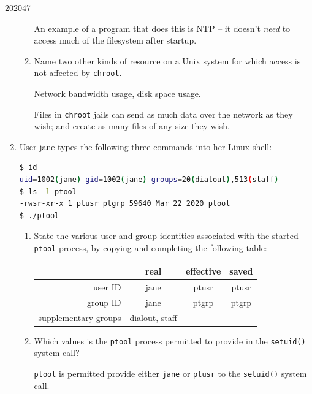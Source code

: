 \documentclass[10pt,\jkfside,a4paper]{article}
\begin{document}
\begin{examquestion}{2020}{4}{7}
\begin{enumerate}
\begin{enumerate}
An example of a program that does this is NTP -- it doesn't \textit{need} to
access much of the filesystem after startup.

\item Name two other kinds of resource on a Unix system for which access is
not affected by \texttt{chroot}.

Network bandwidth usage, disk space usage.

Files in \texttt{chroot} jails can send as much data over the network as
they wish; and create as many files of any size they wish.

\end{enumerate}

\item User jane types the following three commands into her Linux shell:

\begin{lstlisting}[language=bash]
$ id
uid=1002(jane) gid=1002(jane) groups=20(dialout),513(staff)
$ ls -l ptool
-rwsr-xr-x 1 ptusr ptgrp 59640 Mar 22 2020 ptool
$ ./ptool
\end{lstlisting}

\begin{enumerate}

\item State the various user and group identities associated with the started
\texttt{ptool} process, by copying and completing the following table:

\begin{table}[H]
\centering
\begin{tabular}{r|c|c|c}
& real & effective & saved \\
\hline
user ID & jane & ptusr & ptusr \\
\hline
group ID & jane & ptgrp & ptgrp \\
\hline
supplementary groups & dialout, staff & - & - \\
\end{tabular}
\end{table}

\item Which values is the \texttt{ptool} process permitted to provide in the
\texttt{setuid()} system call?

\texttt{ptool} is permitted provide either \texttt{jane} or \texttt{ptusr}
to the \texttt{setuid()} system call.

\end{enumerate}

\end{enumerate}

\end{examquestion}
\end{document}
